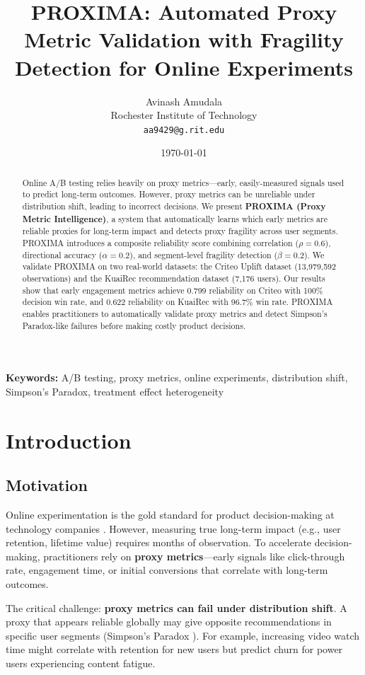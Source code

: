 \documentclass[11pt,twocolumn]{article}
\title{\textbf{PROXIMA: Automated Proxy Metric Validation with Fragility Detection for Online Experiments}}
\author{
    Avinash Amudala \\
    Rochester Institute of Technology \\
    \texttt{aa9429@g.rit.edu}
}
\date{\today}
\begin{document}
\maketitle

\begin{abstract}
Online A/B testing relies heavily on proxy metrics—early, easily-measured signals used to predict long-term outcomes. However, proxy metrics can be unreliable under distribution shift, leading to incorrect decisions. We present \textbf{PROXIMA (Proxy Metric Intelligence)}, a system that automatically learns which early metrics are reliable proxies for long-term impact and detects proxy fragility across user segments. PROXIMA introduces a composite reliability score combining correlation ($\rho = 0.6$), directional accuracy ($\alpha = 0.2$), and segment-level fragility detection ($\beta = 0.2$). We validate PROXIMA on two real-world datasets: the Criteo Uplift dataset (13,979,592 observations) and the KuaiRec recommendation dataset (7,176 users). Our results show that early engagement metrics achieve 0.799 reliability on Criteo with 100\% decision win rate, and 0.622 reliability on KuaiRec with 96.7\% win rate. PROXIMA enables practitioners to automatically validate proxy metrics and detect Simpson's Paradox-like failures before making costly product decisions.
\end{abstract}

\textbf{Keywords:} A/B testing, proxy metrics, online experiments, distribution shift, Simpson's Paradox, treatment effect heterogeneity

\section{Introduction}

\subsection{Motivation}

Online experimentation is the gold standard for product decision-making at technology companies \cite{kohavi2009controlled}. However, measuring true long-term impact (e.g., user retention, lifetime value) requires months of observation. To accelerate decision-making, practitioners rely on \textbf{proxy metrics}—early signals like click-through rate, engagement time, or initial conversions that correlate with long-term outcomes.

The critical challenge: \textbf{proxy metrics can fail under distribution shift}. A proxy that appears reliable globally may give opposite recommendations in specific user segments (Simpson's Paradox \cite{simpson1951interpretation}). For example, increasing video watch time might correlate with retention for new users but predict churn for power users experiencing content fatigue.
\end{document}
